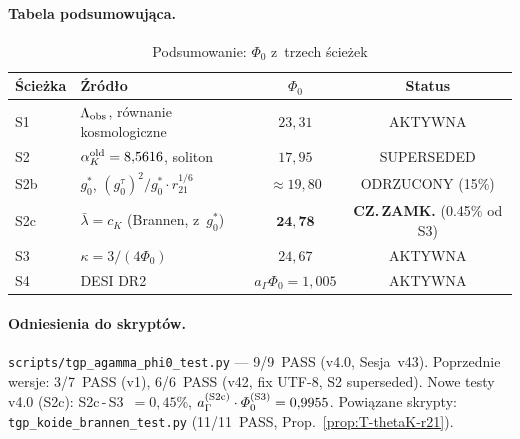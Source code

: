 \paragraph{Tabela podsumowuj\k{a}ca.}

\begin{table}[h]
\centering
\caption{Podsumowanie: $\Phi_0$ z~trzech \'{s}cie\.zek}
\label{tab:W-summary}
\begin{tabular}{llcc}
\hline
\'{S}cie\.zka & \'{Z}r\'od\l{}o & $\Phi_0$ & Status \\
\hline
S1  & $\Lambda_{\rm obs}$, r\'ownanie kosmologiczne & $23{,}31$ & AKTYWNA \\
S2  & $\alpha_K^{\rm old}=8{,}5616$, soliton & $17{,}95$ & SUPERSEDED \\
S2b & $g_0^*$, $(g_0^\tau)^2/g_0^*\cdot r_{21}^{1/6}$ & $\approx 19{,}80$ & ODRZUCONY (15\%) \\
S2c & $\bar\lambda = c_K$ (Brannen, z~$g_0^*$) & $\mathbf{24{,}78}$ & \textbf{CZ.\,ZAMK.} (0.45\% od S3) \\
S3  & $\kappa = 3/(4\Phi_0)$ & $24{,}67$ & AKTYWNA \\
S4  & DESI DR2 & $a_\Gamma\Phi_0=1{,}005$ & AKTYWNA \\
\hline
\end{tabular}
\end{table}

\paragraph{Odniesienia do skrypt\'ow.}
\texttt{scripts/tgp\_agamma\_phi0\_test.py} — 9/9~PASS (v4.0, Sesja~v43).
Poprzednie wersje: 3/7~PASS (v1), 6/6~PASS (v42, fix UTF-8, S2 superseded).
Nowe testy v4.0 (S2c): S2c\,-\,S3~$=0{,}45\%$,
$a_\Gamma^{(\rm S2c)}\cdot\Phi_0^{(\rm S3)} = 0{,}9955$.
Powi\k{a}zane skrypty: \texttt{tgp\_koide\_brannen\_test.py}
(11/11~PASS, Prop.~\ref{prop:T-thetaK-r21}).

